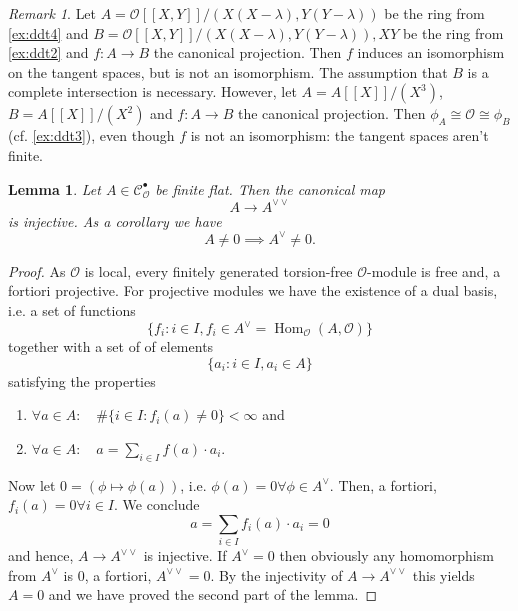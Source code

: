\documentclass{article}
\theoremstyle{plain}%
\newtheorem{lemma}[theorem]{Lemma}
\theoremstyle{definition}
\theoremstyle{remark}
\newtheorem{remark}[theorem]{Remark}
\newcommand{\cob}{\mathcal{C}_\mathcal{O}^\bullet}
\renewcommand{\hom}{\operatorname{Hom}}
\begin{document}
\begin{remark}\cite[remark 5.22, remark 5.23]{Darmon1995}
    Let \(A = \mathcal{O}[[X,Y]]/(X(X-\lambda), Y(Y-\lambda))\) be the ring from \cref{ex:ddt4} and 
    \(B = \mathcal{O}[[X,Y]]/(X(X-\lambda), Y(Y-\lambda)), XY\) be the ring from \cref{ex:ddt2} and 
    \(f\colon A \to B\) the canonical projection. Then \(f\) induces an isomorphism on the tangent spaces,
    but is not an isomorphism. The assumption that \(B\) is a complete intersection is necessary.
    However, let \(A = A[[X]]/(X^3)\), \(B = A[[X]]/(X^2)\) and \(f \colon A \to B\) the canonical projection.
    Then \(\phi_A \cong \mathcal{O} \cong \phi_B\) (cf. \cref{ex:ddt3}), even though \(f\) is not an isomorphism:
    the tangent spaces aren't finite.
\end{remark}

\begin{lemma}\label{lem:pontryagininjectivity}
    Let \(A \in \cob\) be finite flat. Then the canonical map
    \[
        A \to A^{\vee\vee}
    \]
    is injective. As a corollary we have
    \[
        A \neq 0 \implies A^\vee \neq 0.  
    \]
\end{lemma}
\begin{proof}
    As \(\mathcal{O}\) is local, every finitely generated torsion-free \(\mathcal{O}\)-module is free and, 
    a fortiori projective. For projective modules we have the existence of a dual basis, i.e. a set of functions
    \[
        \{f_i \colon i \in I, f_i \in A^\vee = \hom_\mathcal{O}(A, \mathcal{O})\}  
    \]
    together with a set of of elements
    \[
        \{a_i \colon i \in I, a_i \in A\}  
    \]
    satisfying the properties
    \begin{enumerate}
        \item \(\forall a \in A\colon \quad \# \{i\in I\colon f_i(a) \neq 0\} < \infty\) and
        \item \(\forall a \in A\colon \quad a = \sum_{i \in I} f(a)\cdot a_i\).
    \end{enumerate}
    Now let \(0 = (\phi \mapsto \phi(a))\), i.e. \(\phi(a) = 0 \forall \phi \in A^\vee\).
    Then, a fortiori, \(f_i(a) = 0 \forall i \in I\).
    We conclude
    \[
        a = \sum_{i \in I} f_i(a)\cdot a_i = 0
    \]
    and hence, \(A \to A^{\vee\vee}\) is injective. If \(A^\vee = 0\) then obviously any homomorphism from \(A^\vee\)
    is \(0\), a fortiori, \(A^{\vee\vee} = 0\). By the injectivity of \(A \to A^{\vee\vee}\) this yields \(A = 0\)
    and we have proved the second part of the lemma.    
\end{proof}
\end{document}
